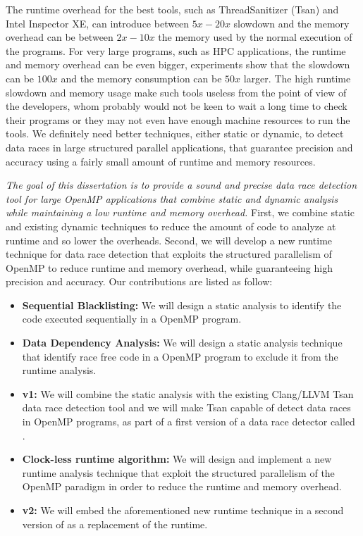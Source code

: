 The runtime overhead for the best tools, such as ThreadSanitizer (Tsan) and
Intel Inspector XE, can introduce between $5x-20x$ slowdown and the memory
overhead can be between $2x-10x$ the memory used by the normal execution of
the programs.
%
For very large programs, such as HPC applications, the runtime and memory
overhead can be even bigger, experiments show that the slowdown can be $100x$
and the memory consumption can be $50x$ larger.
%
The high runtime slowdown and memory usage make such tools useless from the
point of view of the developers, whom probably would not be keen to wait a
long time to check their programs or they may not even have enough machine
resources to run the tools.
%
We definitely need better techniques, either static or dynamic, to detect data
races in large structured parallel applications, that guarantee precision and
accuracy using a fairly small amount of runtime and memory resources.

\emph{The goal of this dissertation is to provide a sound and precise data
  race detection tool for large OpenMP applications that combine static and
  dynamic analysis while maintaining a low runtime and memory overhead.}
%
First, we combine static and existing dynamic techniques to reduce the amount
of code to analyze at runtime and so lower the overheads.
%
Second, we will develop a new runtime technique for data race detection that
exploits the structured parallelism of OpenMP to reduce runtime and memory
overhead, while guaranteeing high precision and accuracy.
%
Our contributions are listed as follow:

\begin{itemize}
\item \textbf{Sequential Blacklisting:} We will design a static analysis to
  identify the code executed sequentially in a OpenMP program.
\item \textbf{Data Dependency Analysis:} We will design a static analysis
  technique that identify race free code in a OpenMP program to exclude it
  from the runtime analysis.
\item \textbf{\archer v1:} We will combine the static analysis with the
  existing Clang/LLVM Tsan data race detection tool and we will make Tsan
  capable of detect data races in OpenMP programs, as part of a first version
  of a data race detector called \archer.
\item \textbf{Clock-less runtime algorithm:} We will design and implement a
  new runtime analysis technique that exploit the structured parallelism of
  the OpenMP paradigm in order to reduce the runtime and memory overhead.
\item \textbf{\archer v2:} We will embed the aforementioned new runtime
  technique in a second version of \archer as a replacement of the \tsan
  runtime.
\end{itemize}

